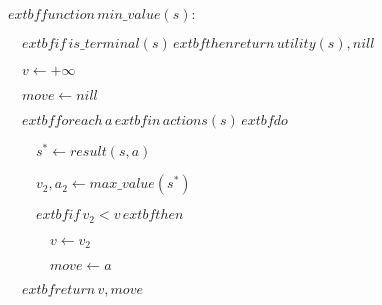 \documentclass[preview]{standalone}
\begin{document}
\begin{center}
$	extbf{function} \, min\_value(s):$
        
        $\quad 	extbf{if} \, is\_terminal(s) \, 	extbf{then return} \, utility(s), nill$

$\quad v \leftarrow +\infty$

$\quad move \leftarrow nill$

$\quad 	extbf{for each} \, a \, 	extbf{in} \, actions(s) \, 	extbf{do}$

$\qquad s^* \leftarrow result(s, a)$

$\qquad v_2, a_2 \leftarrow max\_value(s^*)$

$\qquad 	extbf{if} \, v_2 < v \, 	extbf{then}$

$\qquad \quad v \leftarrow v_2$

$\qquad \quad move \leftarrow a$

$\quad 	extbf{return} \, v, move$
\end{center}
\end{document}
